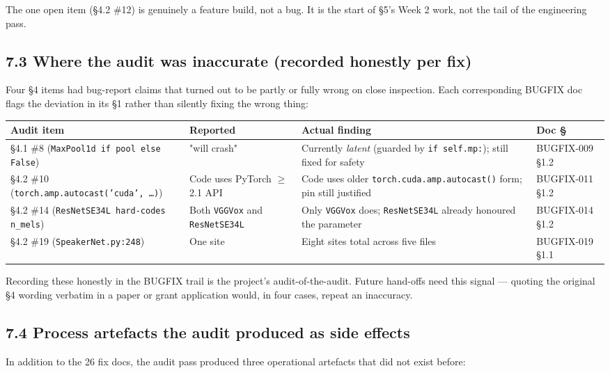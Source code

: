 \documentclass[10pt,a4paper]{article}
\renewcommand{\arraystretch}{1.15}
\begin{document}
The one open item (§4.2 \#12) is genuinely a feature build, not a bug. It is the start of §5's Week 2 work, not the tail of the engineering pass.

\subsection*{7.3 Where the audit was inaccurate (recorded honestly per fix)}

Four §4 items had bug-report claims that turned out to be partly or fully wrong on close inspection. Each corresponding BUGFIX doc flags the deviation in its §1 rather than silently fixing the wrong thing:

\begin{center}
\small
\renewcommand{\arraystretch}{1.25}
\begin{tabularx}{\textwidth}{|Y|Y|Y|Y|}
\hline
Audit item & Reported & Actual finding & Doc § \\
\hline
§4.1 \#8 (\texttt{MaxPool1d if pool else False}) & "will crash" & Currently \textit{latent} (guarded by \texttt{if self.mp:}); still fixed for safety & BUGFIX-009 §1.2 \\
\hline
§4.2 \#10 (\texttt{torch.amp.autocast('cuda', …)}) & Code uses PyTorch $\geq$ 2.1 API & Code uses older \texttt{torch.cuda.amp.autocast()} form; pin still justified & BUGFIX-011 §1.2 \\
\hline
§4.2 \#14 (\texttt{ResNetSE34L hard-codes n\_mels}) & Both \texttt{VGGVox} and \texttt{ResNetSE34L} & Only \texttt{VGGVox} does; \texttt{ResNetSE34L} already honoured the parameter & BUGFIX-014 §1.2 \\
\hline
§4.2 \#19 (\texttt{SpeakerNet.py:248}) & One site & Eight sites total across five files & BUGFIX-019 §1.1 \\
\hline
\end{tabularx}
\end{center}

Recording these honestly in the BUGFIX trail is the project's audit-of-the-audit. Future hand-offs need this signal --- quoting the original §4 wording verbatim in a paper or grant application would, in four cases, repeat an inaccuracy.

\subsection*{7.4 Process artefacts the audit produced as side effects}

In addition to the 26 fix docs, the audit pass produced three operational artefacts that did not exist before:
\end{document}
